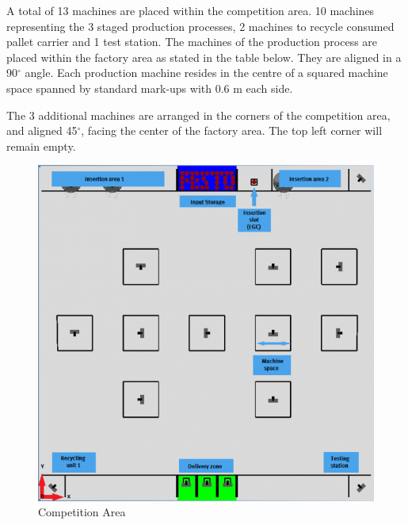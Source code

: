 \documentclass[12pt,twoside]{article}
\begin{document}
A total of 13 machines are placed within the competition area. 10
machines representing the 3 staged production processes, 2 machines to
recycle consumed pallet carrier and 1 test station. The machines of
the production process are placed within the factory area as stated in
the table below. They are aligned in a 90$^\circ$ angle. Each production
machine resides in the centre of a squared machine space spanned by
standard mark-ups with 0.6 m each side.

The 3 additional machines are arranged in the corners of the
competition area, and aligned 45$^\circ$, facing the center of the factory
area. The top left corner will remain empty.

\begin{figure}[h]
  \centering
  \includegraphics[width=0.8\linewidth]{601px-FLC2012_p}
  \caption{Competition Area}
  \label{fig:competition-area}
\end{figure}
\end{document}
